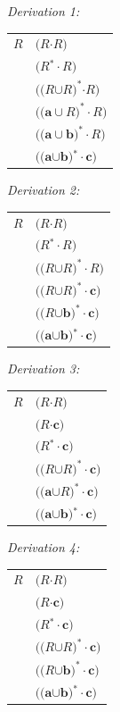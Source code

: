 \noindent\emph{Derivation 1:}
\begin{center}\begin{tabular}{r@{ $\Rightarrow$ }l}
$R$ & $\pmb{(}R\pmb{\cdot} R\pmb)$ \\
& $\pmb{(}R\pmb{^*\cdot} R\pmb{)}$ \\
& $\pmb{((}R\pmb{\cup} R\pmb{)^*}\pmb{\cdot} R\pmb{)}$ \\
& $\pmb{((}\pmb{a\cup} R\pmb{)^*\cdot} R\pmb{)}$ \\
& $\pmb{((}\pmb{a\cup b}\pmb{)^*\cdot} R\pmb{)}$ \\
& $\pmb{((a}\pmb{\cup}\pmb{b)}\pmb{^*\cdot}\pmb{c)}$
\end{tabular}\end{center}
\emph{Derivation 2:}
\begin{center}\begin{tabular}{r@{ $\Rightarrow$ }l}
$R$ & $\pmb{(}R\pmb{\cdot} R\pmb{)}$ \\
& $\pmb{(}R\pmb{^*\cdot} R\pmb{)}$ \\
& $\pmb{((}R{\pmb{\cup}} R\pmb{)^*\cdot} R\pmb{)}$ \\
& $\pmb{((}R{\pmb{\cup}} R\pmb{)^*\cdot c)}$ \\
& $\pmb{((}R{\pmb{\cup}}\pmb{b)^*\cdot c)}$ \\
& $\pmb{((}\pmb{a}{\pmb{\cup}}\pmb{b})\pmb{^*\cdot}\pmb{c})$
\end{tabular}\end{center}
\emph{Derivation 3:}
\begin{center}\begin{tabular}{r@{ $\Rightarrow$ }l}
$R$ & $\pmb{(}R\pmb{\cdot} R\pmb{)}$ \\
& $\pmb{(}R\pmb{\cdot c)}$ \\
& $\pmb{(}R\pmb{^*\cdot c)}$ \\
& $\pmb{((}R\pmb{\cup} R\pmb{)^*\cdot c)}$ \\
& $\pmb{((}\pmb{a}\pmb{\cup} R\pmb{)^*\cdot c)}$ \\
& $\pmb{((a}\pmb{\cup}\pmb{b)}\pmb{^*\cdot}\pmb{c)}$
\end{tabular}\end{center}
\emph{Derivation 4:}
\begin{center}\begin{tabular}{r@{ $\Rightarrow$ }l}
$R$ & $\pmb{(}R\pmb{\cdot} R\pmb{)}$ \\
& $\pmb{(}R\pmb{\cdot c)}$ \\
& $\pmb{(}R\pmb{^*\cdot c)}$ \\
& $\pmb{((}R\pmb{\cup} R\pmb{)^*\cdot c)}$ \\
& $\pmb{((}R\pmb{\cup}\pmb{b)^*\cdot c)}$ \\
& $\pmb{((a}\pmb{\cup}\pmb{b)}\pmb{^*\cdot}\pmb{c)}$
\end{tabular}\end{center}

